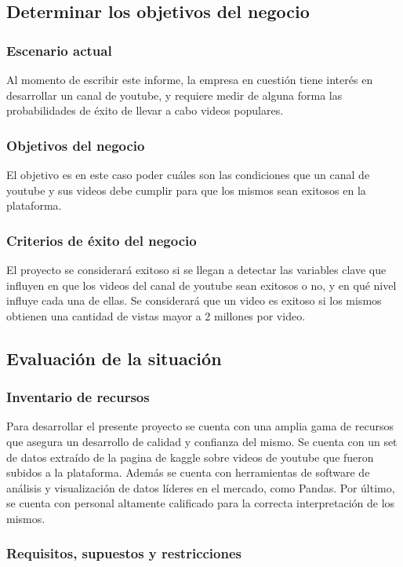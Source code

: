 \subsection{Determinar los objetivos del negocio}
    \subsubsection{Escenario actual}
    Al momento de escribir este informe, la empresa en cuestión tiene interés
    en desarrollar un canal de youtube, y requiere medir de alguna forma las
    probabilidades de éxito de llevar a cabo videos populares.
    \subsubsection{Objetivos del negocio}
    El objetivo es en este caso poder  cuáles son las condiciones que un canal
    de youtube y sus videos debe cumplir para que los mismos sean exitosos en
    la plataforma.
    \subsubsection{Criterios de éxito del negocio}
    El proyecto se considerará exitoso si se llegan a detectar las variables
    clave que influyen en que los videos del canal de youtube sean exitosos o
    no, y en qué nivel influye cada una de ellas. Se considerará que un video es
    exitoso si los mismos obtienen una cantidad de vistas mayor a 2 millones
    por video.

\subsection{Evaluación de la situación}
    \subsubsection{Inventario de recursos}
    Para desarrollar el presente proyecto se cuenta con una amplia gama de recursos que
    asegura un desarrollo de calidad y confianza del mismo.
    Se cuenta con un set de datos extraído de la pagina de kaggle sobre videos
    de youtube que fueron subidos a la plataforma. Además se cuenta con
    herramientas de software de análisis y visualización de datos líderes
    en el mercado, como Pandas. Por último, se cuenta con personal
    altamente calificado para la correcta interpretación de los mismos.

    \subsubsection{Requisitos, supuestos y restricciones}
